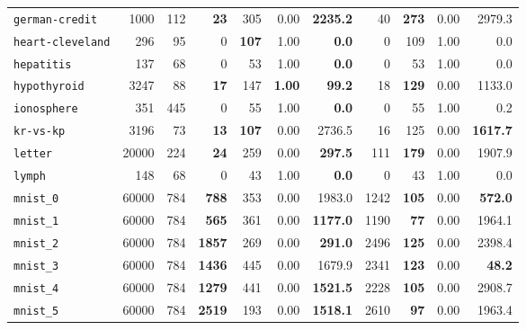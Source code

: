 \begin{tabular}{lccrrrrrrrr}
\texttt{german-credit} & \multicolumn{1}{r}{1000} & \multicolumn{1}{r}{112}  & \textbf{23} & 305 & 0.00 & \textbf{2235.2} & 40 & \textbf{273} & 0.00 & 2979.3\\
\texttt{heart-cleveland} & \multicolumn{1}{r}{296} & \multicolumn{1}{r}{95}  & 0 & \textbf{107} & 1.00 & \textbf{0.0} & 0 & 109 & 1.00 & 0.0\\
\texttt{hepatitis} & \multicolumn{1}{r}{137} & \multicolumn{1}{r}{68}  & 0 & 53 & 1.00 & \textbf{0.0} & 0 & 53 & 1.00 & 0.0\\
\texttt{hypothyroid} & \multicolumn{1}{r}{3247} & \multicolumn{1}{r}{88}  & \textbf{17} & 147 & \textbf{1.00} & \textbf{99.2} & 18 & \textbf{129} & 0.00 & 1133.0\\
\texttt{ionosphere} & \multicolumn{1}{r}{351} & \multicolumn{1}{r}{445}  & 0 & 55 & 1.00 & \textbf{0.0} & 0 & 55 & 1.00 & 0.2\\
\texttt{kr-vs-kp} & \multicolumn{1}{r}{3196} & \multicolumn{1}{r}{73}  & \textbf{13} & \textbf{107} & 0.00 & 2736.5 & 16 & 125 & 0.00 & \textbf{1617.7}\\
\texttt{letter} & \multicolumn{1}{r}{20000} & \multicolumn{1}{r}{224}  & \textbf{24} & 259 & 0.00 & \textbf{297.5} & 111 & \textbf{179} & 0.00 & 1907.9\\
\texttt{lymph} & \multicolumn{1}{r}{148} & \multicolumn{1}{r}{68}  & 0 & 43 & 1.00 & \textbf{0.0} & 0 & 43 & 1.00 & 0.0\\
\texttt{mnist\_0} & \multicolumn{1}{r}{60000} & \multicolumn{1}{r}{784}  & \textbf{788} & 353 & 0.00 & 1983.0 & 1242 & \textbf{105} & 0.00 & \textbf{572.0}\\
\texttt{mnist\_1} & \multicolumn{1}{r}{60000} & \multicolumn{1}{r}{784}  & \textbf{565} & 361 & 0.00 & \textbf{1177.0} & 1190 & \textbf{77} & 0.00 & 1964.1\\
\texttt{mnist\_2} & \multicolumn{1}{r}{60000} & \multicolumn{1}{r}{784}  & \textbf{1857} & 269 & 0.00 & \textbf{291.0} & 2496 & \textbf{125} & 0.00 & 2398.4\\
\texttt{mnist\_3} & \multicolumn{1}{r}{60000} & \multicolumn{1}{r}{784}  & \textbf{1436} & 445 & 0.00 & 1679.9 & 2341 & \textbf{123} & 0.00 & \textbf{48.2}\\
\texttt{mnist\_4} & \multicolumn{1}{r}{60000} & \multicolumn{1}{r}{784}  & \textbf{1279} & 441 & 0.00 & \textbf{1521.5} & 2228 & \textbf{105} & 0.00 & 2908.7\\
\texttt{mnist\_5} & \multicolumn{1}{r}{60000} & \multicolumn{1}{r}{784}  & \textbf{2519} & 193 & 0.00 & \textbf{1518.1} & 2610 & \textbf{97} & 0.00 & 1963.4\\

\end{tabular}
